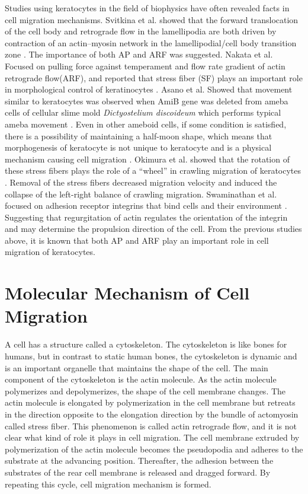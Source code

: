 \documentclass[a4paper,12pt]{book}
\begin{document}
Studies using keratocytes in the field of biophysics have often revealed facts in cell migration mechanisms. Svitkina et al. showed that the forward translocation of the cell body and retrograde flow in the lamellipodia are both driven by contraction of an actin–myosin network in the lamellipodial/cell body transition zone \cite{svitkina1997analysis}. The importance of both AP and ARF was suggested. Nakata et al. Focused on pulling force against temperament and flow rate gradient of actin retrograde flow(ARF), and reported that stress fiber (SF) plays an important role in morphological control of keratinocytes \cite{nakata2016role}. Asano et al. Showed that movement similar to keratocytes was observed when AmiB gene was deleted from ameba cells of cellular slime mold {\it Dictyostelium discoideum} which performs typical ameba movement \cite{asano2004keratocyte}. Even in other ameboid cells, if some condition is satisfied, there is a possibility of maintaining a half-moon shape, which means that morphogenesis of keratocyte is not unique to keratocyte and is a physical mechanism causing cell migration . Okimura et al. showed that the rotation of these stress fibers plays the role of a “wheel” in crawling migration of keratocytes \cite{okimura2018rotation}. Removal of the stress fibers decreased migration velocity and induced the collapse of the left-right balance of crawling migration. Swaminathan et al.  focused on adhesion receptor integrins that bind cells and their environment \cite{swaminathan2017actin}. Suggesting that regurgitation of actin regulates the orientation of the integrin and may determine the propulsion direction of the cell. From the previous studies above, it is known that both AP and ARF play an important role in cell migration of keratocytes.

\section{Molecular Mechanism of Cell Migration}
A cell has a structure called a cytoskeleton. The cytoskeleton is like bones for humans, but in contrast to static human bones, the cytoskeleton is dynamic and is an important organelle that maintains the shape of the cell. The main component of the cytoskeleton is the actin molecule. As the actin molecule polymerizes and depolymerizes, the shape of the cell membrane changes. The actin molecule is elongated by polymerization in the cell membrane but retreats in the direction opposite to the elongation direction by the bundle of actomyosin called stress fiber. This phenomenon is called actin retrograde flow, and it is not clear what kind of role it plays in cell migration. The cell membrane extruded by polymerization of the actin molecule becomes the pseudopodia and adheres to the substrate at the advancing position. Thereafter, the adhesion between the substrates of the rear cell membrane is released and dragged forward. By repeating this cycle, cell migration mechanism is formed.
\end{document}

